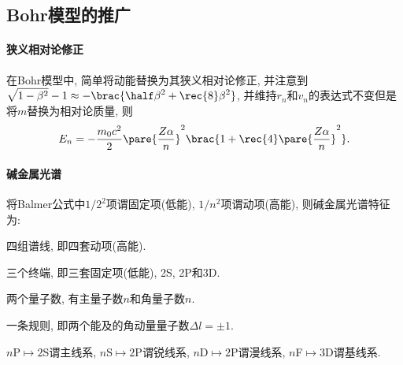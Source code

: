\documentclass{ctexart}
\begin{document}

\subsection{Bohr模型的推广} %
\label{sub:bohr模型的推广}

\paragraph{狭义相对论修正} %
\label{par:狭义相对论修正}

在Bohr模型中, 简单将动能替换为其狭义相对论修正, 并注意到$\displaystyle \sqrt{1-\beta^2} - 1 \approx -\brac{\half \beta^2 + \rec{8}\beta^2}$, 并维持$r_n$和$v_n$的表达式不变但是将$m$替换为相对论质量, 则
\[ E_n = -\frac{m_0c^2}{2}\pare{\frac{Z\alpha}{n}}^2\brac{1+\rec{4}\pare{\frac{Z\alpha}{n}}^2}. \]


\paragraph{碱金属光谱} %
\label{par:碱金属光谱}

将Balmer公式中$1/2^2$项谓固定项(低能), $1/n^2$项谓动项(高能), 则碱金属光谱特征为:
\begin{cenum}
    \item 四组谱线, 即四套动项(高能).
    \item 三个终端, 即三套固定项(低能), 2S, 2P和3D.
    \item 两个量子数, 有主量子数$n$和角量子数$n$.
    \item 一条规则, 即两个能及的角动量量子数$\Delta l = \pm 1$.
\end{cenum}
$n$P$\mapsto 2$S谓主线系, $n$S$\mapsto 2$P谓锐线系, $n$D$\mapsto 2$P谓漫线系, $n$F$\mapsto 3$D谓基线系.



\end{document}
